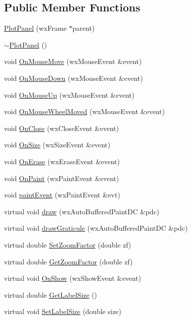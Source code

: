 \subsection*{Public Member Functions}
\begin{DoxyCompactItemize}
\item 
\hyperlink{class_plot_panel_a27892db4859ae9afca652f4175a7f88c}{Plot\-Panel} (wx\-Frame $\ast$parent)
\item 
\hyperlink{class_plot_panel_a956d38d1f35d70f90b6399acfcd0f38d}{$\sim$\-Plot\-Panel} ()
\item 
void \hyperlink{class_plot_panel_aa44338288a6fce70a6683b3e556dc44d}{On\-Mouse\-Move} (wx\-Mouse\-Event \&event)
\item 
void \hyperlink{class_plot_panel_ad2e6780f516e870139eecf753223f708}{On\-Mouse\-Down} (wx\-Mouse\-Event \&event)
\item 
void \hyperlink{class_plot_panel_a291b7a817083d10883226cf52a74e71e}{On\-Mouse\-Up} (wx\-Mouse\-Event \&event)
\item 
void \hyperlink{class_plot_panel_a6a537f5cdc334aaa423fa25d86bbf0af}{On\-Mouse\-Wheel\-Moved} (wx\-Mouse\-Event \&event)
\item 
void \hyperlink{class_plot_panel_adb48aa0b95cd2e744795881146ca3563}{On\-Close} (wx\-Close\-Event \&event)
\item 
void \hyperlink{class_plot_panel_a994c5955446c7b606ec70db498f4edc0}{On\-Size} (wx\-Size\-Event \&event)
\item 
void \hyperlink{class_plot_panel_a7af545a2edf85655c28e5af4a41c0161}{On\-Erase} (wx\-Erase\-Event \&event)
\item 
void \hyperlink{class_plot_panel_a72ee37d726eb276bf9aca7f3b50c7b85}{On\-Paint} (wx\-Paint\-Event \&event)
\item 
void \hyperlink{class_plot_panel_a042c9df2ebe0c245d9fb5f3aa63595bc}{paint\-Event} (wx\-Paint\-Event \&evt)
\item 
virtual void \hyperlink{class_plot_panel_a974601747a67a4637a3a133cefe70c13}{draw} (wx\-Auto\-Buffered\-Paint\-D\-C \&pdc)
\item 
virtual void \hyperlink{class_plot_panel_a5444b418c756380e5e08f86a34615be3}{draw\-Graticule} (wx\-Auto\-Buffered\-Paint\-D\-C \&pdc)
\item 
virtual double \hyperlink{class_plot_panel_a8e8722d1f4c02f166f7acd6905ea4009}{Set\-Zoom\-Factor} (double zf)
\item 
virtual double \hyperlink{class_plot_panel_a6f6ef3db5a4b4f6cb50d92a38fa36dbd}{Get\-Zoom\-Factor} (double zf)
\item 
virtual void \hyperlink{class_plot_panel_a3858e2d6bd9f1cfc900c5a1c7391e0fb}{On\-Show} (wx\-Show\-Event \&event)
\item 
virtual double \hyperlink{class_plot_panel_a539ab140f79c5cff29031aa312a9f159}{Get\-Label\-Size} ()
\item 
virtual void \hyperlink{class_plot_panel_a2fcb6c7fc21c942122b0a8f4d4a9af2d}{Set\-Label\-Size} (double size)
\end{DoxyCompactItemize}
